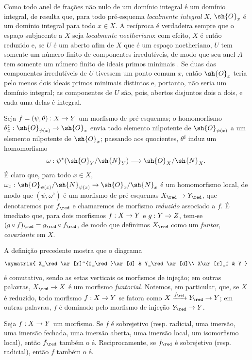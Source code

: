 \documentclass[oneside]{amsart}
\makeatletter
\newcommand{\ega@arrow}[2]{\mathchoice{#1}{#2}{#2}{#2}}
\renewcommand{\to}{\ega@arrow{\longrightarrow}{\rightarrow}}
\newcommand{\oldpage}[2][]{{\marginnote{\normalfont\textbf{#1}~|~#2}}\ignorespaces}
\let\EGAOriginalLabel\label
\renewcommand{\label}[1]{\phantomsection\EGAOriginalLabel{#1}}
\makeatother
\begin{document}
Como todo anel de frações não nulo de um domínio integral é um domínio integral, de  resulta que, para todo pré-esquema \emph{localmente integral} $X$, $\sh{O}_x$ é um domínio integral para todo $x\in X$.
A recíproca é verdadeira sempre que o espaço subjacente a $X$ seja \emph{localmente noetheriano}:
com efeito, $X$ é então reduzido e, se $U$ é um aberto afim de $X$ que é um espaço noetheriano, $U$ tem somente um número finito de componentes irredutíveis, de modo que seu anel $A$ tem somente um número finito de ideais primos minimais .
Se duas das componentes irredutíveis de $U$ tivessem um ponto comum $x$, então $\sh{O}_x$ teria pelo menos dois ideais primos minimais distintos e, portanto, não seria um domínio integral;
as componentes de $U$ são, pois, abertos disjuntos dois a dois, e cada uma delas é integral.

\begin{env}[5.1.5]
\label{I.5.1.5}
Seja $f=(\psi,\theta):X\to Y$ um morfismo de pré-esquemas;
\oldpage[I]{129}
o homomorfismo $\theta_x^\sharp:\sh{O}_{\psi(x)}\to\sh{O}_x$ envia todo elemento nilpotente de $\sh{O}_{\psi(x)}$ a um elemento nilpotente de $\sh{O}_x$;
passando aos quocientes, $\theta^\sharp$ induz um homomorfismo
\[
  \omega:\psi^*(\sh{O}_Y/\sh{N}_Y)\to\sh{O}_X/\sh{N}_X.
\]
É claro que, para todo $x\in X$, $\omega_x:\sh{O}_{\psi(x)}/\sh{N}_{\psi(x)}\to\sh{O}_x/\sh{N}_x$ é um homomorfismo local, de modo que $(\psi,\omega^\flat)$ é um morfismo de pré-esquemas $X_\red\to Y_\red$, que denotaremos por $f_\red$ e chamaremos de morfismo \emph{reduzido} associado a $f$.
É imediato que, para dois morfismos $f:X\to Y$ e $g:Y\to Z$, tem-se $(g\circ f)_\red=g_\red\circ f_\red$, de modo que definimos $X_\red$ como um \emph{funtor}, \emph{covariante} em $X$.

A definição precedente mostra que o diagrama
\[
  \xymatrix{
    X_\red\ar[r]^{f_\red}\ar[d] &
    Y_\red\ar[d]\\
    X\ar[r]_f &
    Y
  }
\]
é comutativo, sendo as setas verticais os morfismos de injeção;
em outras palavras, $X_\red\to X$ é um morfismo \emph{funtorial}.
Notemos, em particular, que, se $X$ é reduzido, todo morfismo $f:X\to Y$ se fatora como $X\xrightarrow{f_\red}Y_\red\to Y$;
em outras palavras, $f$ é dominado pelo morfismo de injeção $Y_\red\to Y$.
\end{env}

\begin{proposition}[5.1.6]
\label{I.5.1.6}
Seja $f:X\to Y$ um morfismo.
Se $f$ é sobrejetivo (resp. radicial, uma imersão, uma imersão fechada, uma imersão aberta, uma imersão local, um isomorfismo local), então $f_\red$ também o é.
Reciprocamente, se $f_\red$ é sobrejetivo (resp. radicial), então $f$ também o é.
\end{proposition}
\end{document}
